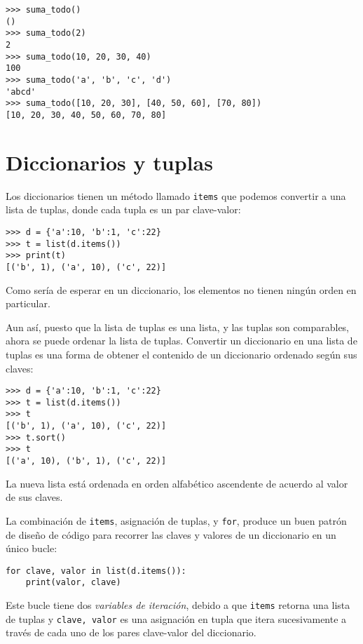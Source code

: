 \begin{Verbatim}[frame=single]
>>> suma_todo()
()
>>> suma_todo(2)
2
>>> suma_todo(10, 20, 30, 40)
100
>>> suma_todo('a', 'b', 'c', 'd')
'abcd'
>>> suma_todo([10, 20, 30], [40, 50, 60], [70, 80])
[10, 20, 30, 40, 50, 60, 70, 80]
\end{Verbatim}

\hypertarget{diccionarios-y-tuplas}{%
\section{Diccionarios y tuplas}\label{diccionarios-y-tuplas}}

  

Los diccionarios tienen un método llamado \texttt{items} que podemos convertir a una
lista de tuplas, donde cada tupla es un par clave-valor:


\begin{Verbatim}[frame=single]
>>> d = {'a':10, 'b':1, 'c':22}
>>> t = list(d.items())
>>> print(t)
[('b', 1), ('a', 10), ('c', 22)]
\end{Verbatim}


Como sería de esperar en un diccionario, los elementos no tienen ningún
orden en particular.

Aun así, puesto que la lista de tuplas es una lista, y las tuplas son
comparables, ahora se puede ordenar la lista de tuplas. Convertir un
diccionario en una lista de tuplas es una forma de obtener el contenido
de un diccionario ordenado según sus claves:

\begin{Verbatim}[frame=single]
>>> d = {'a':10, 'b':1, 'c':22}
>>> t = list(d.items())
>>> t
[('b', 1), ('a', 10), ('c', 22)]
>>> t.sort()
>>> t
[('a', 10), ('b', 1), ('c', 22)]
\end{Verbatim}

La nueva lista está ordenada en orden alfabético ascendente de acuerdo
al valor de sus claves.

La combinación de \texttt{items}, asignación de tuplas, y \texttt{for},
produce un buen patrón de diseño de código para recorrer las claves y
valores de un diccionario en un único bucle:

\begin{Verbatim}[frame=single]
for clave, valor in list(d.items()):
    print(valor, clave)
\end{Verbatim}


Este bucle tiene dos \emph{variables de iteración}, debido a que
\texttt{items} retorna una lista de tuplas y \texttt{clave,\ valor} es
una asignación en tupla que itera sucesivamente a través de cada uno de
los pares clave-valor del diccionario.

